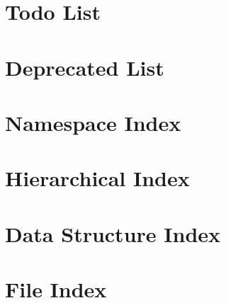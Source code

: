 \documentclass[twoside]{book}
\newcommand{\+}{\discretionary{\mbox{\scriptsize$\hookleftarrow$}}{}{}}
\begin{document}
\chapter{Todo List}
\label{todo}

\chapter{Deprecated List}
\label{deprecated}

\chapter{Namespace Index}

\chapter{Hierarchical Index}

\chapter{Data Structure Index}

\chapter{File Index}

\end{document}
